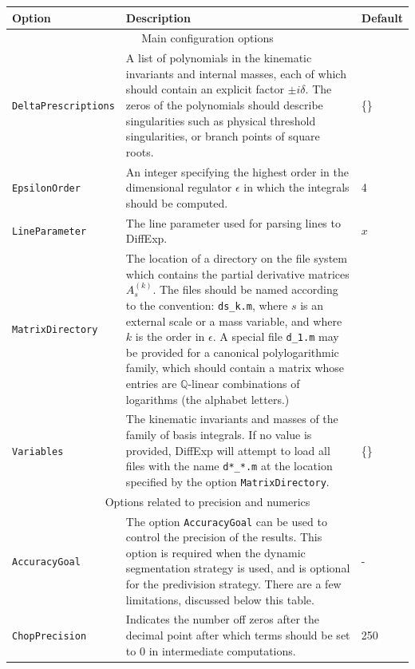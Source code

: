 \documentclass{article}
\newcommand\xrowht[2][0]{\addstackgap[.5\dimexpr#2\relax]{\vphantom{#1}}}
\begin{document}
\begin{tabularx}{\textwidth}{ | l | X | l |} 
\hline
Option & Description & Default \\\hline
\multicolumn{3}{|c|}{Main configuration options \xrowht[()]{10pt}} \\ \hline
\texttt{DeltaPrescriptions} & A list of polynomials in the kinematic invariants and internal masses, each of which should contain an explicit factor $\pm i\delta$. The zeros of the polynomials should describe singularities such as physical threshold singularities, or branch points of square roots. & \{\} \\\hline
\texttt{EpsilonOrder} & An integer specifying the highest order in the dimensional regulator $\epsilon$ in which the integrals should be computed. & 4 \\\hline
\texttt{LineParameter} & The line parameter used for parsing lines to DiffExp. & $x$ \\\hline
\texttt{MatrixDirectory} & The location of a directory on the file system which contains the partial derivative matrices $A_{s}^{(k)}$. The files should be named according to the convention: \texttt{ds\_k.m}, where $s$ is an external scale or a mass variable, and where $k$ is the order in $\epsilon$. A special file \texttt{d\_1.m} may be provided for a canonical polylogarithmic family, which should contain a matrix whose entries are $\mathbb{Q}$-linear combinations of logarithms (the alphabet letters.) &  \\\hline
\texttt{Variables} & The kinematic invariants and masses of the family of basis integrals. If no value is provided, DiffExp will attempt to load all files with the name \texttt{d*\_*.m} at the location specified by the option \texttt{MatrixDirectory}. & \{\}\\\hline
\multicolumn{3}{|c|}{Options related to precision and numerics\xrowht[()]{10pt}}  \\ \hline
\texttt{AccuracyGoal} & The option \texttt{AccuracyGoal} can be used to control the precision of the results. This option is required when the dynamic segmentation strategy is used, and is optional for the predivision strategy. There are a few limitations, discussed below this table.
& - \\\hline
\texttt{ChopPrecision} & Indicates the number off zeros after the decimal point after which terms should be set to 0 in intermediate computations. & 250 \\\hline

\end{tabularx}
\end{document}
